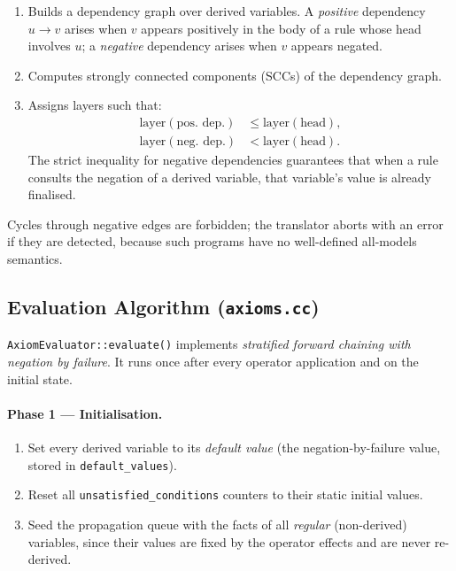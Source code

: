 \documentclass[11pt,a4paper]{article}
\begin{document}
\begin{enumerate}
  \item Builds a dependency graph over derived variables.  A \emph{positive}
        dependency $u \to v$ arises when $v$ appears positively in the body of
        a rule whose head involves $u$; a \emph{negative} dependency arises
        when $v$ appears negated.
  \item Computes strongly connected components (SCCs) of the dependency graph.
  \item Assigns layers such that:
        \begin{align*}
          \text{layer}(\text{pos.\ dep.}) &\leq \text{layer}(\text{head}), \\
          \text{layer}(\text{neg.\ dep.}) &<   \text{layer}(\text{head}).
        \end{align*}
        The strict inequality for negative dependencies guarantees that when a
        rule consults the negation of a derived variable, that variable's value
        is already finalised.
\end{enumerate}

Cycles through negative edges are forbidden; the translator aborts with an
error if they are detected, because such programs have no well-defined
all-models semantics.

\subsection{Evaluation Algorithm (\texttt{axioms.cc})}

\texttt{AxiomEvaluator::evaluate()} implements \emph{stratified forward
chaining with negation by failure}.  It runs once after every operator
application and on the initial state.

\paragraph{Phase 1 — Initialisation.}
\begin{enumerate}
  \item Set every derived variable to its \emph{default value} (the
        negation-by-failure value, stored in \texttt{default\_values}).
  \item Reset all \texttt{unsatisfied\_conditions} counters to their static
        initial values.
  \item Seed the propagation queue with the facts of all \emph{regular}
        (non-derived) variables, since their values are fixed by the operator
        effects and are never re-derived.
\end{enumerate}
\end{document}
